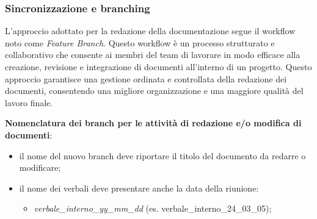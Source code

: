 \subsubsection{Sincronizzazione e branching}

	\label{nomenclatura}
L'approccio adottato per la redazione della documentazione segue il workflow noto come \textit{Feature Branch}. Questo workflow è un processo strutturato e collaborativo che consente ai membri del team di lavorare in modo efficace alla creazione, revisione e integrazione di documenti all'interno di un progetto. Questo approccio garantisce una gestione ordinata e controllata della redazione dei documenti, consentendo una migliore organizzazione e una maggiore qualità del lavoro finale.
\begin{flushleft}
	\textbf{Nomenclatura dei branch per le attività di redazione e/o modifica di documenti}: \label{convenzioni_nomenclatura}
\end{flushleft}
\begin{itemize}
	\item il nome del nuovo branch deve riportare il titolo del documento da redarre o modificare;
	\item il nome dei verbali deve presentare anche la data della riunione:
	      \begin{itemize}
		      \item \textit{verbale\_interno\_yy\_mm\_dd} (es. verbale\_interno\_24\_03\_05);
	      \end{itemize}
\end{itemize}

